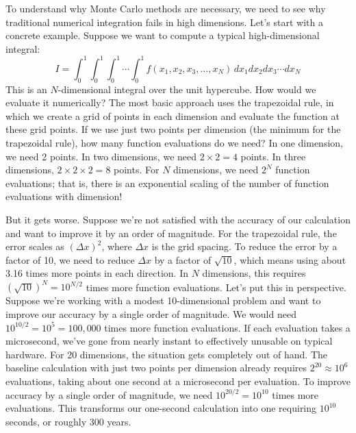 To understand why Monte Carlo methods are necessary, we need to see why traditional numerical integration fails in high dimensions. Let's start with a concrete example. Suppose we want to compute a typical high-dimensional integral:
\begin{equation}
    I = \int_0^1 \int_0^1 \int_0^1 \cdots \int_0^1 f(x_1, x_2, x_3, \ldots, x_N) \, dx_1 dx_2 dx_3 \cdots dx_N
\end{equation}
This is an $N$-dimensional integral over the unit hypercube. How would we evaluate it numerically? The most basic approach uses the trapezoidal rule, in which we create a grid of points in each dimension and evaluate the function at these grid points. If we use just two points per dimension (the minimum for the trapezoidal rule), how many function evaluations do we need? In one dimension, we need 2 points. In two dimensions, we need $2 \times 2 = 4$ points. In three dimensions, $2 \times 2 \times 2 = 8$ points. For $N$ dimensions, we need $2^N$ function evaluations; that is, there is an exponential scaling of the number of function evaluations with dimension!

But it gets worse. Suppose we're not satisfied with the accuracy of our calculation and want to improve it by an order of magnitude. For the trapezoidal rule, the error scales as $(\Delta x)^2$, where $\Delta x$ is the grid spacing. To reduce the error by a factor of 10, we need to reduce $\Delta x$ by a factor of $\sqrt{10}$, which means using about 3.16 times more points in each direction. In $N$ dimensions, this requires $(\sqrt{10})^N = 10^{N/2}$ times more function evaluations. Let's put this in perspective. Suppose we're working with a modest 10-dimensional problem and want to improve our accuracy by a single order of magnitude. We would need $10^{10/2} = 10^5 = 100{,}000$ times more function evaluations. If each evaluation takes a microsecond, we've gone from nearly instant to effectively unusable on typical hardware. For 20 dimensions, the situation gets completely out of hand. The baseline calculation with just two points per dimension already requires $2^{20} \approx 10^6$ evaluations, taking about one second at a microsecond per evaluation. To improve accuracy by a single order of magnitude, we need $10^{20/2} = 10^{10}$ times more evaluations. This transforms our one-second calculation into one requiring $10^{10}$ seconds, or roughly 300 years.

